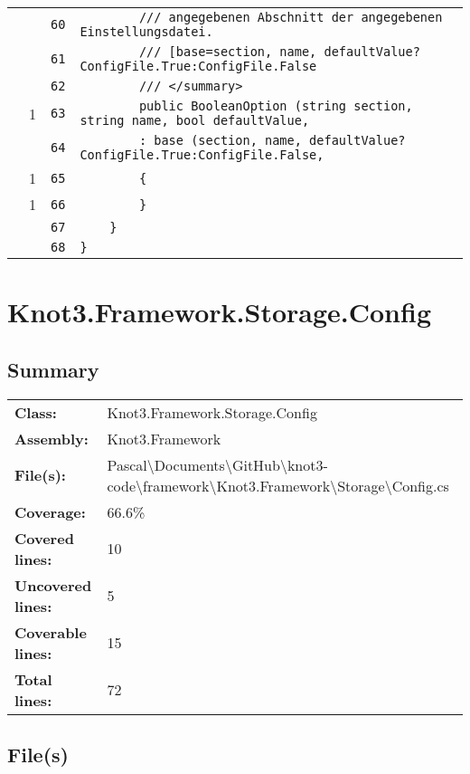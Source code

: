 \documentclass[a4paper,10pt]{article}
\begin{document}
\begin{longtable}[l]{lrrl}
\cellcolor{gray} &  & \verb~60~ & \verb~        /// angegebenen Abschnitt der angegebenen Einstellungsdatei.~\\
\cellcolor{gray} &  & \verb~61~ & \verb~        /// [base=section, name, defaultValue?ConfigFile.True:ConfigFile.False~\\
\cellcolor{gray} &  & \verb~62~ & \verb~        /// </summary>~\\
\cellcolor{green} & 1 & \verb~63~ & \verb~        public BooleanOption (string section, string name, bool defaultValue, ~\\
\cellcolor{gray} &  & \verb~64~ & \verb~        : base (section, name, defaultValue?ConfigFile.True:ConfigFile.False, ~\\
\cellcolor{green} & 1 & \verb~65~ & \verb~        {~\\
\cellcolor{green} & 1 & \verb~66~ & \verb~        }~\\
\cellcolor{gray} &  & \verb~67~ & \verb~    }~\\
\cellcolor{gray} &  & \verb~68~ & \verb~}~\\
\end{longtable}
\newpage
\section{Knot3.Framework.Storage.Config}
\subsection{Summary}
\begin{longtable}[l]{ll}
\textbf{Class:} & Knot3.Framework.Storage.Config\\
\textbf{Assembly:} & Knot3.Framework\\
\textbf{File(s):} & \begin{minipage}[t]{12cm}{Pascal\textbackslash Documents\textbackslash GitHub\textbackslash knot3-code\textbackslash framework\textbackslash Knot3.Framework\textbackslash Storage\textbackslash Config.cs}\end{minipage} \\
\textbf{Coverage:} & 66.6\%\\
\textbf{Covered lines:} & 10\\
\textbf{Uncovered lines:} & 5\\
\textbf{Coverable lines:} & 15\\
\textbf{Total lines:} & 72\\
\end{longtable}
\subsection{File(s)}
\end{document}
